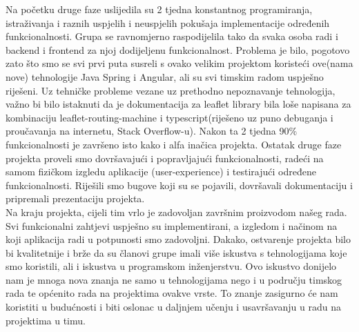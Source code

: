 		 \textnormal{Na početku druge faze uslijedila su 2 tjedna konstantnog programiranja, istraživanja i raznih uspjelih i neuspjelih pokušaja implementacije određenih funkcionalnosti. Grupa se ravnomjerno raspodijelila tako da svaka osoba radi i backend i frontend za njoj dodijeljenu funkcionalnost. Problema je bilo, pogotovo zato što smo se svi prvi puta susreli s ovako velikim projektom koristeći ove(nama nove) tehnologije Java Spring i Angular, ali su svi timskim radom uspješno riješeni. Uz tehničke probleme vezane uz prethodno nepoznavanje tehnologija, važno bi bilo istaknuti da je dokumentacija za leaflet library bila loše napisana za kombinaciju leaflet-routing-machine i typescript(riješeno uz puno debuganja i proučavanja na internetu, Stack Overflow-u). Nakon ta 2 tjedna 90\% funkcionalnosti je završeno isto kako i alfa inačica projekta. Ostatak druge faze projekta proveli smo dovršavajući i popravljajući funkcionalnosti, radeći na samom fizičkom izgledu aplikacije (user-experience) i testirajući određene funkcionalnosti. Riješili smo bugove koji su se pojavili, dovršavali dokumentaciju i pripremali prezentaciju projekta.}\\
		 
		 \textnormal{Na kraju projekta, cijeli tim vrlo je zadovoljan završnim proizvodom našeg rada. Svi funkcionalni zahtjevi uspješno su implementirani, a izgledom i načinom na koji aplikacija radi u potpunosti smo zadovoljni. Dakako, ostvarenje projekta bilo bi kvalitetnije i brže da su članovi grupe imali više iskustva s tehnologijama koje smo koristili, ali i iskustva u programskom inženjerstvu. Ovo iskustvo donijelo nam je mnoga nova znanja ne samo u tehnologijama nego i u području timskog rada te općenito rada na projektima ovakve vrste. To znanje zasigurno će nam koristiti u budućnosti i biti oslonac u daljnjem učenju i usavršavanju u radu na projektima u timu.}\\
		
		\eject 
